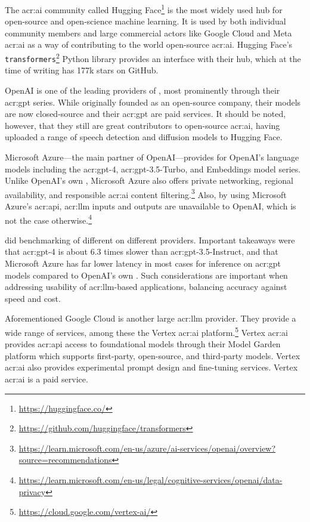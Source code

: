 The \acrshort{acr:ai} community called Hugging Face\footnote{\url{https://huggingface.co/}} is the most widely used hub for open-source and open-science machine learning. It is used by both individual community members and large commercial actors like Google Cloud and Meta \acrshort{acr:ai} as a way of contributing to the world open-source \acrshort{acr:ai}. Hugging Face's \texttt{transformers}\footnote{\url{https://github.com/huggingface/transformers}} Python library provides an interface with their hub, which at the time of writing has 177k stars on GitHub.

OpenAI is one of the leading providers of , most prominently through their \acrshort{acr:gpt} series. While originally founded as an open-source company, their models are now closed-source and their \acrshort{acr:gpt}  are paid services. It should be noted, however, that they still are great contributors to open-source \acrshort{acr:ai}, having uploaded a range of speech detection and diffusion models to Hugging Face.

Microsoft Azure---the main partner of OpenAI---provides  for OpenAI's language models including the \acrshort{acr:gpt}-4, \acrshort{acr:gpt}-3.5-Turbo, and Embeddings model series. Unlike OpenAI's own , Microsoft Azure also offers private networking, regional availability, and responsible \acrshort{acr:ai} content filtering.\footnote{\url{https://learn.microsoft.com/en-us/azure/ai-services/openai/overview?source=recommendations}} Also, by using Microsoft Azure's \acrshort{acr:api}, \acrshort{acr:llm} inputs and outputs are unavailable to OpenAI, which is not the case otherwise.\footnote{\url{https://learn.microsoft.com/en-us/legal/cognitive-services/openai/data-privacy}}

\cite{clearyLatencyBenchmarksComparisons2023} did benchmarking of different  on different providers. Important takeaways were that \acrshort{acr:gpt}-4 is about 6.3 times slower than \acrshort{acr:gpt}-3.5-Instruct, and that Microsoft Azure has far lower latency in most cases for inference on \acrshort{acr:gpt} models compared to OpenAI's own . Such considerations are important when addressing usability of \acrshort{acr:llm}-based applications, balancing accuracy against speed and cost.

Aforementioned Google Cloud is another large \acrshort{acr:llm} provider. They provide a wide range of services, among these the Vertex \acrshort{acr:ai} platform.\footnote{\url{https://cloud.google.com/vertex-ai/}} Vertex \acrshort{acr:ai} provides \acrshort{acr:api} access to foundational models through their Model Garden platform which supports first-party, open-source, and third-party models. Vertex \acrshort{acr:ai} also provides experimental prompt design and fine-tuning services. Vertex \acrshort{acr:ai} is a paid service.

